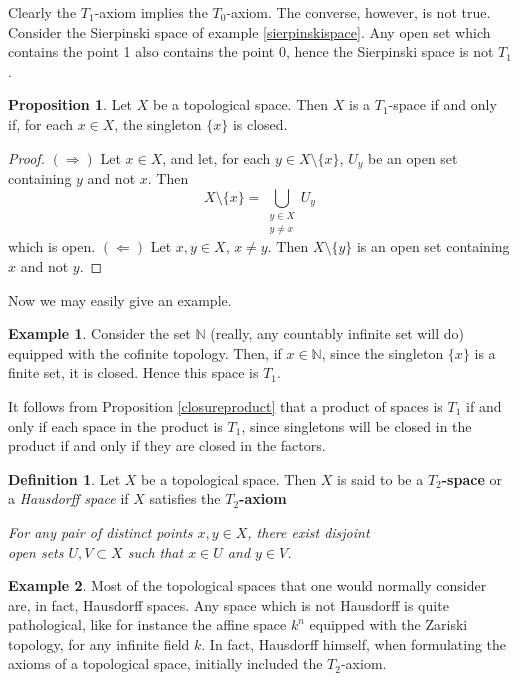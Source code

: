 \documentclass{book}
\theoremstyle{definition}
\newtheorem{proposition}{Proposition}[section]
\newtheorem{definition}{Definition}[section]
\newtheorem{example}{Example}[section]
\theoremstyle{remark}
\newcommand{\N}{\mathbb{N}}
\begin{document}
Clearly the $T_1$-axiom implies the $T_0$-axiom. The converse, however, is not true. Consider the Sierpinski space of example \ref{sierpinskispace}. Any open set which contains the point 1 also contains the point 0, hence the Sierpinski space is not $T_1$.

\begin{proposition}
Let $X$ be a topological space. Then $X$ is a $T_1$-space if and only if, for each $x\in X$, the singleton $\{x\}$ is closed.
\end{proposition}
\begin{proof}
$(\Rightarrow)$ Let $x\in X$, and let, for each $y\in X\setminus\{x\}$, $U_y$ be an open set containing $y$ and not $x$. Then
$$X\setminus\{x\}=\bigcup_{\substack{y\in X\\y\neq x}}U_y$$
which is open. $(\Leftarrow)$ Let $x,y\in X$, $x\neq y$. Then $X\setminus\{y\}$ is an open set containing $x$ and not $y$.
\end{proof}

Now we may easily give an example.

\begin{example}
\label{t1butnott2}
Consider the set $\N$ (really, any countably infinite set will do) equipped with the cofinite topology. Then, if $x\in\N$, since the singleton $\{x\}$ is a finite set, it is closed. Hence this space is $T_1$.
\end{example}

It follows from Proposition \ref{closureproduct} that a product of spaces is $T_1$ if and only if each space in the product is $T_1$, since singletons will be closed in the product if and only if they are closed in the factors.

\begin{definition}
Let $X$ be a topological space. Then $X$ is said to be a \textbf{$T_2$-space} or a \textit{Hausdorff space} if $X$ satisfies the \textbf{$T_2$-axiom}
\begin{center}
    \textit{For any pair of distinct points $x,y\in X$, there exist disjoint\\open sets $U,V\subset X$ such that $x\in U$ and $y\in V$.}
\end{center}
\end{definition}

\begin{example}
Most of the topological spaces that one would normally consider are, in fact, Hausdorff spaces. Any space which is not Hausdorff is quite pathological, like for instance the affine space $k^n$ equipped with the Zariski topology, for any infinite field $k$. In fact, Hausdorff himself, when formulating the axioms of a topological space, initially included the $T_2$-axiom.
\end{example}
\end{document}
